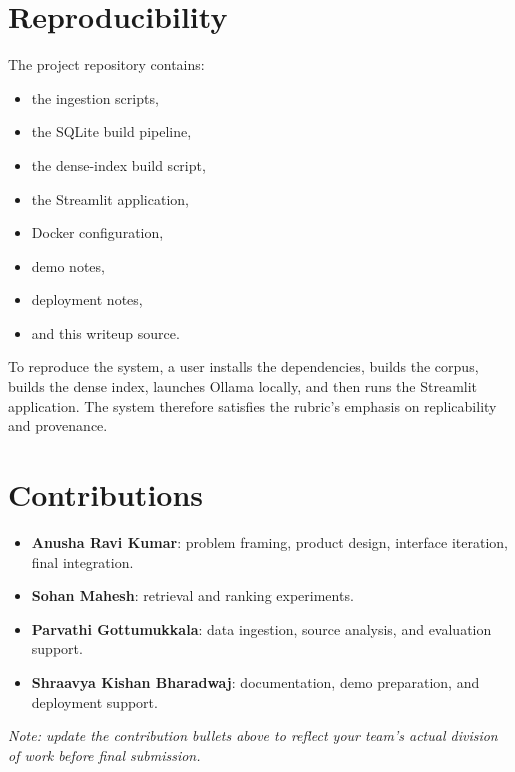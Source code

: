 \documentclass[11pt]{article}
\begin{document}
\section{Reproducibility}
The project repository contains:
\begin{itemize}[leftmargin=*]
    \item the ingestion scripts,
    \item the SQLite build pipeline,
    \item the dense-index build script,
    \item the Streamlit application,
    \item Docker configuration,
    \item demo notes,
    \item deployment notes,
    \item and this writeup source.
\end{itemize}

To reproduce the system, a user installs the dependencies, builds the corpus, builds the dense index, launches Ollama locally, and then runs the Streamlit application. The system therefore satisfies the rubric's emphasis on replicability and provenance.

\section{Contributions}
\begin{itemize}[leftmargin=*]
    \item \textbf{Anusha Ravi Kumar}: problem framing, product design, interface iteration, final integration.
    \item \textbf{Sohan Mahesh}: retrieval and ranking experiments.
    \item \textbf{Parvathi Gottumukkala}: data ingestion, source analysis, and evaluation support.
    \item \textbf{Shraavya Kishan Bharadwaj}: documentation, demo preparation, and deployment support.
\end{itemize}

\noindent
\textit{Note: update the contribution bullets above to reflect your team's actual division of work before final submission.}
\end{document}

